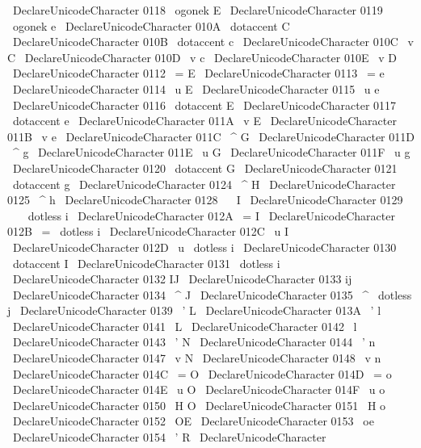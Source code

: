 {{{{{\
DeclareUnicodeCharacter
{
0118
}
{
\
ogonek
{
E
}
}
\
DeclareUnicodeCharacter
{
0119
}
{
\
ogonek
{
e
}
}
\
DeclareUnicodeCharacter
{
010A
}
{
\
dotaccent
{
C
}
}
\
DeclareUnicodeCharacter
{
010B
}
{
\
dotaccent
{
c
}
}
\
DeclareUnicodeCharacter
{
010C
}
{
\
v
{
C
}
}
\
DeclareUnicodeCharacter
{
010D
}
{
\
v
{
c
}
}
\
DeclareUnicodeCharacter
{
010E
}
{
\
v
{
D
}
}
\
DeclareUnicodeCharacter
{
0112
}
{
\
=
E
}
\
DeclareUnicodeCharacter
{
0113
}
{
\
=
e
}
\
DeclareUnicodeCharacter
{
0114
}
{
\
u
{
E
}
}
\
DeclareUnicodeCharacter
{
0115
}
{
\
u
{
e
}
}
\
DeclareUnicodeCharacter
{
0116
}
{
\
dotaccent
{
E
}
}
\
DeclareUnicodeCharacter
{
0117
}
{
\
dotaccent
{
e
}
}
\
DeclareUnicodeCharacter
{
011A
}
{
\
v
{
E
}
}
\
DeclareUnicodeCharacter
{
011B
}
{
\
v
{
e
}
}
\
DeclareUnicodeCharacter
{
011C
}
{
\
^
G
}
\
DeclareUnicodeCharacter
{
011D
}
{
\
^
g
}
\
DeclareUnicodeCharacter
{
011E
}
{
\
u
{
G
}
}
\
DeclareUnicodeCharacter
{
011F
}
{
\
u
{
g
}
}
\
DeclareUnicodeCharacter
{
0120
}
{
\
dotaccent
{
G
}
}
\
DeclareUnicodeCharacter
{
0121
}
{
\
dotaccent
{
g
}
}
\
DeclareUnicodeCharacter
{
0124
}
{
\
^
H
}
\
DeclareUnicodeCharacter
{
0125
}
{
\
^
h
}
\
DeclareUnicodeCharacter
{
0128
}
{
\
~
I
}
\
DeclareUnicodeCharacter
{
0129
}
{
\
~
{
\
dotless
{
i
}
}
}
\
DeclareUnicodeCharacter
{
012A
}
{
\
=
I
}
\
DeclareUnicodeCharacter
{
012B
}
{
\
=
{
\
dotless
{
i
}
}
}
\
DeclareUnicodeCharacter
{
012C
}
{
\
u
{
I
}
}
\
DeclareUnicodeCharacter
{
012D
}
{
\
u
{
\
dotless
{
i
}
}
}
\
DeclareUnicodeCharacter
{
0130
}
{
\
dotaccent
{
I
}
}
\
DeclareUnicodeCharacter
{
0131
}
{
\
dotless
{
i
}
}
\
DeclareUnicodeCharacter
{
0132
}
{
IJ
}
\
DeclareUnicodeCharacter
{
0133
}
{
ij
}
\
DeclareUnicodeCharacter
{
0134
}
{
\
^
J
}
\
DeclareUnicodeCharacter
{
0135
}
{
\
^
{
\
dotless
{
j
}
}
}
\
DeclareUnicodeCharacter
{
0139
}
{
\
'
L
}
\
DeclareUnicodeCharacter
{
013A
}
{
\
'
l
}
\
DeclareUnicodeCharacter
{
0141
}
{
\
L
}
\
DeclareUnicodeCharacter
{
0142
}
{
\
l
}
\
DeclareUnicodeCharacter
{
0143
}
{
\
'
N
}
\
DeclareUnicodeCharacter
{
0144
}
{
\
'
n
}
\
DeclareUnicodeCharacter
{
0147
}
{
\
v
{
N
}
}
\
DeclareUnicodeCharacter
{
0148
}
{
\
v
{
n
}
}
\
DeclareUnicodeCharacter
{
014C
}
{
\
=
O
}
\
DeclareUnicodeCharacter
{
014D
}
{
\
=
o
}
\
DeclareUnicodeCharacter
{
014E
}
{
\
u
{
O
}
}
\
DeclareUnicodeCharacter
{
014F
}
{
\
u
{
o
}
}
\
DeclareUnicodeCharacter
{
0150
}
{
\
H
{
O
}
}
\
DeclareUnicodeCharacter
{
0151
}
{
\
H
{
o
}
}
\
DeclareUnicodeCharacter
{
0152
}
{
\
OE
}
\
DeclareUnicodeCharacter
{
0153
}
{
\
oe
}
\
DeclareUnicodeCharacter
{
0154
}
{
\
'
R
}
\
DeclareUnicodeCharacter
}}}}}
